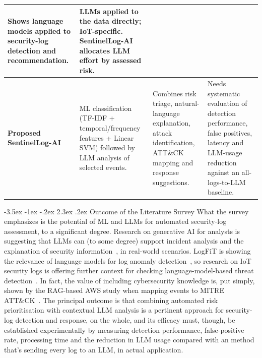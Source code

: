 \documentclass[12pt,a4paper]{report}
\makeatletter
\renewcommand\section{\@startsection {section}{1}{\z@}%
  {-3.5ex \@plus -1ex \@minus -.2ex}%
  {2.3ex \@plus .2ex}%
  {\normalfont\fontsize{17}{21}\selectfont\bfseries}}
\makeatother
\begin{document}
\begin{longtable}{>{\raggedright\arraybackslash}p{2.3cm} >{\raggedright\arraybackslash}p{4.35cm} >{\raggedright\arraybackslash}p{4.05cm} >{\raggedright\arraybackslash}p{4.25cm}}
Shows language models applied to security-log detection and recommendation. &
LLMs applied to the data directly; IoT-specific. SentinelLog-AI allocates LLM effort by assessed risk.\\
\midrule
\textbf{Proposed SentinelLog-AI} &
ML classification (TF-IDF + temporal/frequency features + Linear SVM) followed by LLM analysis of selected events. &
Combines risk triage, natural-language explanation, attack identification, ATT\&CK mapping and response suggestions. &
Needs systematic evaluation of detection performance, false positives, latency and LLM-usage reduction against an all-logs-to-LLM baseline.\\
\end{longtable}

\section{Outcome of the Literature Survey}
What the survey emphasizes is the potential of ML and LLMs for automated security-log assessment, to a significant degree. Research on generative AI for analysts is suggesting that LLMs can (to some degree) support incident analysis and the explanation of security information~\cite{balogh2024}, in real-world scenarios. LogFiT is showing the relevance of language models for log anomaly detection~\cite{logfit}, so research on IoT security logs is offering further context for checking language-model-based threat detection~\cite{tejero2025}. In fact, the value of including cybersecurity knowledge is, put simply, shown by the RAG-based AWS study when mapping events to MITRE ATT\&CK~\cite{adediran2026}.
The principal outcome is that combining automated risk prioritisation with contextual LLM analysis is a pertinent approach for security-log detection and response, on the whole, and its efficacy must, though, be established experimentally by measuring detection performance, false-positive rate, processing time and the reduction in LLM usage compared with an method that's sending every log to an LLM, in actual application.
\end{document}
